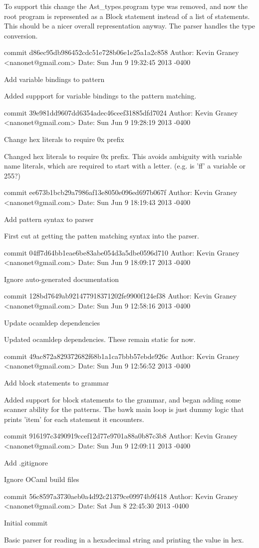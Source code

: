     To support this change the Ast_types.program type was removed, and
    now the root program is represented as a Block statement instead of
    a list of statements.  This should be a nicer overall
    representation anyway.  The parser handles the type conversion.

commit d86ec95db986452cdc51e728b06e1e25a1a2c858
Author: Kevin Graney <nanonet@gmail.com>
Date:   Sun Jun 9 19:32:45 2013 -0400

    Add variable bindings to pattern
    
    Added suppport for variable bindings to the pattern matching.

commit 39e981dd9607dd6354adec46ceef31885dfd7024
Author: Kevin Graney <nanonet@gmail.com>
Date:   Sun Jun 9 19:28:19 2013 -0400

    Change hex literals to require 0x prefix
    
    Changed hex literals to require 0x prefix.  This avoids ambiguity
    with variable name literals, which are required to start with a
    letter.  (e.g. is 'ff' a variable or 255?)

commit ee673b1bcb29a7986af13e8050e096ed697b067f
Author: Kevin Graney <nanonet@gmail.com>
Date:   Sun Jun 9 18:19:43 2013 -0400

    Add pattern syntax to parser
    
    First cut at getting the patten matching syntax into the parser.

commit 04ff7d64bb1eae6be83abe054d3a5dbe0596d710
Author: Kevin Graney <nanonet@gmail.com>
Date:   Sun Jun 9 18:09:17 2013 -0400

    Ignore auto-generated documentation

commit 128bd7649ab921477918371202fe9900f124ef38
Author: Kevin Graney <nanonet@gmail.com>
Date:   Sun Jun 9 12:58:16 2013 -0400

    Update ocamldep dependencies
    
    Updated ocamldep dependencies.  These remain static for now.

commit 49ac872a829372682f68b1a1ca7bbb57ebde926c
Author: Kevin Graney <nanonet@gmail.com>
Date:   Sun Jun 9 12:56:52 2013 -0400

    Add block statements to grammar
    
    Added support for block statements to the grammar, and began
    adding some scanner ability for the patterns.  The bawk main loop
    is just dummy logic that prints 'item' for each statement it
    encounters.

commit 916197c3490919ccef12d77e9701a88a0b87c3b8
Author: Kevin Graney <nanonet@gmail.com>
Date:   Sun Jun 9 12:09:11 2013 -0400

    Add .gitignore
    
    Ignore OCaml build files

commit 56c8597a3730aeb0a4d92c21379ce09974b9f418
Author: Kevin Graney <nanonet@gmail.com>
Date:   Sat Jun 8 22:45:30 2013 -0400

    Initial commit
    
    Basic parser for reading in a hexadecimal string and printing the
    value in hex.
